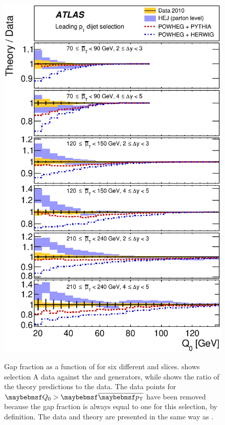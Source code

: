 \begin{figure}[htpb]
{    \includegraphics[width=\smallfigwidth]{chapters/gbj/GapFraction_Q0Dist_gap_sel_A_Ratio.eps}
    \label{fig:gbj:Gap_fraction_Q0_A_ratio}}
  \caption{Gap fraction as a function of \Qnought for six different \pTbar and \DeltaY
           slices. \protect{} shows selection
           A data against the \HEJ and \Powheg generators, while \protect{}
           shows the ratio of the theory predictions to the data. The data points for $\Qnought > \pTbar$ have been
           removed because the gap fraction is always equal to one for this
           \dijet selection, by definition. The data and theory are presented in
           the same way as .}
  \label{fig:gbj:Gap_fraction_Q0_A}
\end{figure}

